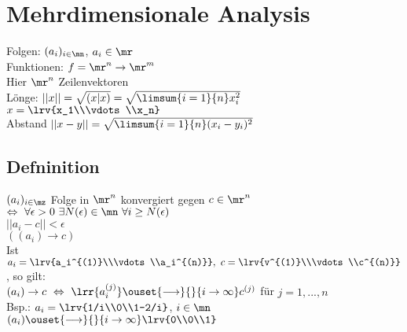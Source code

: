 \chapter{Mehrdimensionale Analysis}

	Folgen: $ (a_i)_{i\in\mn} $, $ a_i\in\mr $\\
	Funktionen: $ f=\mr^n\rightarrow\mr^m $\\
	Hier $ \mr^n $ Zeilenvektoren\\
	Lönge: $ ||x||=\sqrt{(x|x)}=\sqrt{\limsum{i=1}{n}x_i^2} $\\
	$ x=\lrv{x_1\\\vdots\\x_n} $\\
	Abstand $ ||x-y||=\sqrt{\limsum{i=1}{n}(x_i-y_i)^2} $
	
\section{Defninition}
	$ (a_i)_{i\in\mz} $ Folge in $ \mr^n $ konvergiert gegen $ c\in\mr^n $\\
	$ \Leftrightarrow\ \forall\epsilon>0\ \exists N(\epsilon)\in\mn\ \forall i\geq N(\epsilon) $\\
	$ ||a_i-c||<\epsilon $\\
	$ ((a_i)\rightarrow c) $\\
	Ist $ a_i=\lrv{a_i^{(1)}\\\vdots\\a_i^{(n)}},\ c=\lrv{v^{(1)}\\\vdots\\c^{(n)}} $, so gilt:\\
	$ (a_i)\rightarrow c\ \Leftrightarrow\ \lrr{a_i^{(j)}}\ouset{\longrightarrow}{}{i\rightarrow\infty}c^{(j)} $ für $ j=1,...,n $\\
	Bsp.: $ a_i=\lrv{1/i\\0\\1-2/i} $, $ i\in\mn $\\
	$ (a_i)\ouset{\longrightarrow}{}{i\rightarrow\infty}\lrv{0\\0\\1} $
	
